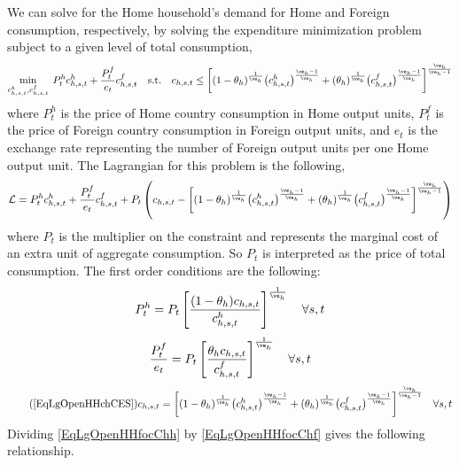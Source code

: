     We can solve for the Home household's demand for Home and Foreign consumption, respectively, by solving the expenditure minimization problem subject to a given level of total consumption,
    \begin{equation}\label{EqLgOpenHHminprobH}
      \min_{c^h_{h,s,t},c^f_{h,s,t}} \: P^h_t c^h_{h,s,t} + \frac{P^f_t}{e_t}c^f_{h,s,t} \quad \text{s.t.} \quad c_{h,s,t} \leq \biggl[(1 - \theta_h)^\frac{1}{\ve_h}\bigl(c^h_{h,s,t}\bigr)^\frac{\ve_h-1}{\ve_h} + (\theta_h)^\frac{1}{\ve_h}\bigl(c^f_{h,s,t}\bigr)^\frac{\ve_h-1}{\ve_h}\biggr]^\frac{\ve_h}{\ve_h-1}
    \end{equation}
    where $P^h_t$ is the price of Home country consumption in Home output units, $P^f_t$ is the price of Foreign country consumption in Foreign output units, and $e_t$ is the exchange rate representing the number of Foreign output units per one Home output unit. The Lagrangian for this problem is the following,
    \begin{equation}\label{EqLgOpenHHlagrH}
      \mathcal{L} = P^h_t c^h_{h,s,t} + \frac{P^f_t}{e_t}c^f_{h,s,t} + P_t\left(c_{h,s,t} - \biggl[(1 - \theta_h)^\frac{1}{\ve_h}\bigl(c^h_{h,s,t}\bigr)^\frac{\ve_h-1}{\ve_h} + (\theta_h)^\frac{1}{\ve_h}\bigl(c^f_{h,s,t}\bigr)^\frac{\ve_h-1}{\ve_h}\biggr]^\frac{\ve_h}{\ve_h-1}\right)
    \end{equation}
    where $P_t$ is the multiplier on the constraint and represents the marginal cost of an extra unit of aggregate consumption. So $P_t$ is interpreted as the price of total consumption. The first order conditions are the following:
    \begin{equation}\label{EqLgOpenHHfocChh}
      P^h_t = P_t\left[\frac{(1-\theta_h) c_{h,s,t}}{c^h_{h,s,t}}\right]^{\frac{1}{\ve_h}} \quad\forall s,t
    \end{equation}
    \begin{equation}\label{EqLgOpenHHfocChf}
      \frac{P^f_t}{e_t} = P_t\left[\frac{\theta_h c_{h,s,t}}{c^f_{h,s,t}}\right]^{\frac{1}{\ve_h}} \quad\forall s,t
    \end{equation}
    \begin{equation}\tag{\ref{EqLgOpenHHchCES}}
      c_{h,s,t}= \biggl[(1 - \theta_h)^\frac{1}{\ve_h}\bigl(c^h_{h,s,t}\bigr)^\frac{\ve_h-1}{\ve_h} + (\theta_h)^\frac{1}{\ve_h}\bigl(c^f_{h,s,t}\bigr)^\frac{\ve_h-1}{\ve_h}\biggr]^\frac{\ve_h}{\ve_h-1} \quad\forall s,t
    \end{equation}
    Dividing \eqref{EqLgOpenHHfocChh} by \eqref{EqLgOpenHHfocChf} gives the following relationship.
